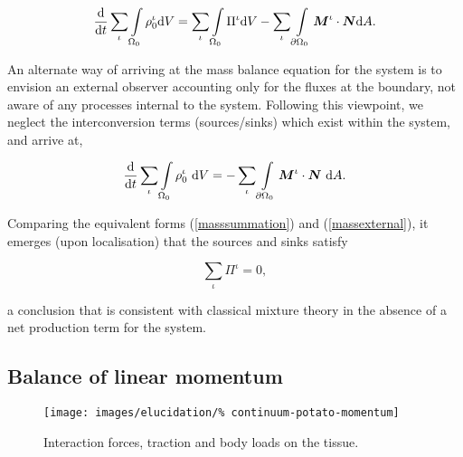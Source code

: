 \begin{equation}
\frac{\mathrm{d}}{\mathrm{d}t} \sum\limits_\iota\int\limits_{\Omega_0}
\rho_0^\iota \mathrm{d}V = \sum\limits_\iota \int\limits_{\Omega_0}
\Pi^\iota \mathrm{d}V - \sum\limits_\iota
\int\limits_{\partial\Omega_0}\mbox{\boldmath$ M$}^\iota\cdot\mbox{\boldmath$ N$} \mathrm{d}A.
\label{masssummation}
\end{equation}

\noindent An alternate way of arriving at the mass balance equation
for the system is to envision an external observer accounting only for
the fluxes at the boundary, not aware of any processes internal to the
system. Following this viewpoint, we neglect the interconversion terms
(sources/sinks) which exist within the system, and arrive at,

\begin{equation}
\frac{\mathrm{d}}{\mathrm{d}t}\sum\limits_\iota
\int\limits_{\Omega_0}\rho_0^\iota \ \mathrm{d}V =
-\sum\limits_\iota\int\limits_{\partial\Omega_0}\mbox{\boldmath$ M$}^\iota\cdot\mbox{\boldmath$ N$}
\ \mathrm{d}A.
\label{massexternal}
\end{equation}

\noindent Comparing the equivalent forms (\ref{masssummation}) and
(\ref{massexternal}), it emerges (upon localisation) that the sources
and sinks satisfy

\begin{equation}
\sum\limits_\iota\Pi^\iota = 0,
\label{masssummationresult}
\end{equation}

\noindent a conclusion that is consistent with classical mixture
theory \citep{TruesdellNoll:65} in the absence of a net production
term for the system.

\subsection{Balance of linear momentum}
\label{balance-of-linear-momentum}

\begin{figure}[ht]
  \centering
  \texttt{[image: images/elucidation/\%
    continuum-potato-momentum]}
  \caption{Interaction forces, traction and body loads on the tissue.}
  \label{continuum-potato-momentum}
\end{figure}

